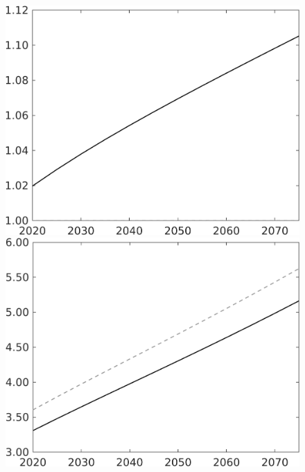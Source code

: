 \documentclass[12pt]{article}
\begin{document}
\begin{figure}[h!!]
\begin{minipage}[]{0.32\textwidth}
\end{minipage}	
	\begin{minipage}[]{0.32\textwidth}
		\includegraphics[width=1\textwidth]{../../codding_model/own_basedOnFried/optimalPol_010922_revision/figures/all_13Sept22/CompTaul_Equlab_LFBAU_Reg0_lambdaa_spillover0_nsk1_xgr0_knspil1_sep1_countec0_GovRev0_etaa0.79_lgd0.png}
	\end{minipage}	
	\begin{minipage}[]{0.32\textwidth}
		\includegraphics[width=1\textwidth]{../../codding_model/own_basedOnFried/optimalPol_010922_revision/figures/all_13Sept22/CompTaul_Equlab_LFBAU_Reg0_Y_spillover0_nsk1_xgr0_knspil1_sep1_countec0_GovRev0_etaa0.79_lgd0.png}

\end{minipage}
\end{figure}
\end{document}
